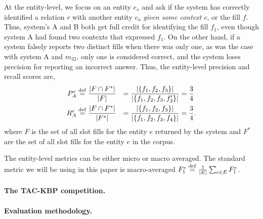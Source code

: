 At the entity-level, we focus on an entity $e_s$ and ask if the system has correctly identified a relation $r$ with another entity $e_o$ \textit{given some context $c$}, or the fill $f$.
Thus, system's A and B both get full credit for identifying the fill $f_1$, even though system A had found two contexts that expressed $f_1$.  
On the other hand, if a system falsely reports two distinct fills when there was only one, as was the case with system A and $m_{32}$, only one is considered correct, and the system loses precision for reporting an incorrect answer. 
Thus, the entity-level precision and recall scores are,
\begin{align*}
  P^e_A &\stackrel{\rm def}{=} \frac{|F \cap F^*|}{|F|} &= \frac{|\{f_{1}, f_{2}, f_{3}\}|}{|\{f_{1}, f_{2}, f_{3}, f_{3}'\}|} &= \frac{3}{4} \\
  R^e_A &\stackrel{\rm def}{=} \frac{|F \cap F^*|}{|F^*|} &= \frac{|\{f_{1}, f_{2}, f_{3}\}|}{|\{f_{1}, f_{2}, f_{3}, f_{4}\}|} &= \frac{3}{4}.
\end{align*}
where $F$ is the set of all slot fills for the entity $e$ returned by the system and $F^*$ are the set of all slot fills for the entity $e$ in the corpus.

The entity-level metrics can be either micro or macro averaged.
The standard metric we will be using in this paper is macro-averaged $F_1^e \stackrel{\rm def}{=} \frac{1}{|E|} \sum_{e \in E} F_1^{e}$.

\paragraph{The TAC-KBP competition.}
%

\paragraph{Evaluation methodology.}


